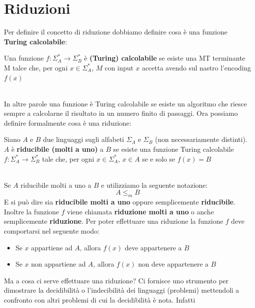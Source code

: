 \section{Riduzioni} \label{riduzioni}
Per definire il concetto di riduzione dobbiamo definire cosa è una funzione \textbf{Turing calcolabile}:\smallskip\\
\colorbox{SALZO}{\parbox{\dimexpr\linewidth-2\fboxsep}{\begin{definition}
   Una funzione $f:\Sigma_A^* \to \Sigma_B^*$ è \textbf{(Turing) calcolabile} se esiste una MT terminante M talce che, per ogni $x \in \Sigma_A^*$, $M$ con input $x$ accetta avendo sul nastro l'encoding $f(x)$
\end{definition}}}\smallskip\\
In altre parole una funzione è Turing calcolabile se esiste un algoritmo che riesce sempre a calcolarne il risultato in un numero finito di passaggi. Ora possiamo definire formalmente cosa è una riduzione:\smallskip\\
\colorbox{SALZO}{\parbox{\dimexpr\linewidth-2\fboxsep}{\begin{definition}
   Siano $A$ e $B$ due linguaggi sugli alfabeti $\Sigma_A$ e $\Sigma_B$ (non necessariamente distinti). \\$A$ è \textbf{riducibile (molti a uno)} a $B$ se esiste una funzione Turing calcolabile $f:\Sigma_A^* \to \Sigma_B^*$ tale che, per ogni $x \in \Sigma_A^*$,
   $x \in A$ se e solo se $f(x) = B$  
\end{definition}}}\smallskip\\
Se $A$ riducibile molti a uno a $B$ e utilizziamo la seguente notazione:
\[    A \le_{m} B        \]
E si può dire sia \textbf{riducibile molti a uno} oppure semplicemente \textbf{riducibile}.\\
Inoltre la funzione $f$ viene chiamata \textbf{riduzione molti a uno} o anche semplicemente \textbf{riduzione}.\newpage
\noindent Per poter effettuare una riduzione la funzione $f$ deve comportarsi nel seguente modo:
\begin{itemize}
    \item Se $x$ appartiene ad $A$, allora $f(x)$ deve appartenere a $B$
    \item Se $x$ non appartiene ad $A$, allora $f(x)$ non deve appartenere a $B$
\end{itemize}
Ma a cosa ci serve effettuare una riduzione? Ci fornisce uno strumento per dimostrare la decidibilità o l'indecibilità dei linguaggi (problemi) mettendoli a confronto con altri problemi di cui la decidibilità è nota. Infatti
